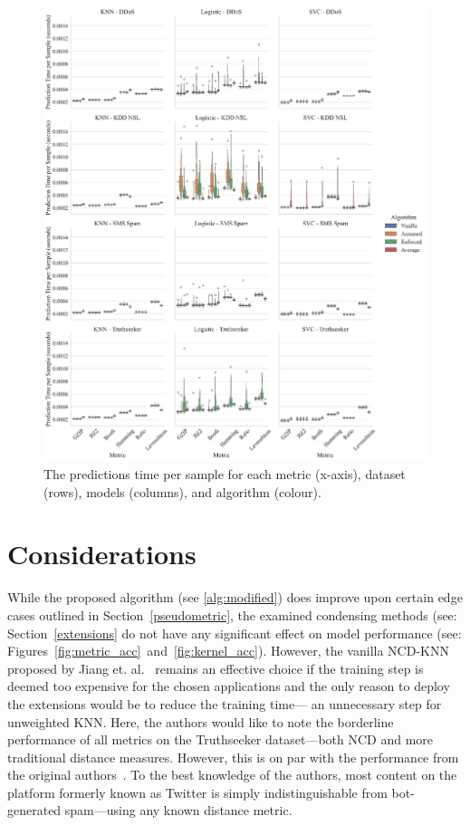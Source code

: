 \documentclass[conference]{IEEEtran}
\begin{document}
\begin{figure}[htb]
    \includegraphics[width=\textwidth]{images/pred_time_vs_algorithm.pdf}
    \caption{The predictions time per sample for each metric (x-axis), dataset (rows), models (columns), and algorithm (colour).}
    \label{fig:pred_time}
\end{figure}



\section{Considerations}
\label{considerations}
While the proposed algorithm (see \ref{alg:modified}) does improve upon certain edge cases outlined in Section~\ref{pseudometric}, the examined condensing methods (see: Section~\ref{extensions} do not have any significant effect on model performance (see: Figures~\ref{fig:metric_acc}~and~\ref{fig:kernel_acc}). 
However, the vanilla NCD-KNN proposed by Jiang et. al.~\cite{jiang2022less} remains an effective choice if the training step is deemed too expensive for the chosen applications and the only reason to deploy the extensions would be to reduce the training time--- an unnecessary step for unweighted KNN. 
Here, the authors would like to note the borderline performance of all metrics on the Truthseeker dataset---both NCD and more traditional distance measures. However, this is on par with the performance from the original authors~\cite{truthseeker}. To the best knowledge of the authors, most content on the platform formerly known as Twitter is simply indistinguishable from bot-generated spam---using any known distance metric.
\end{document}
